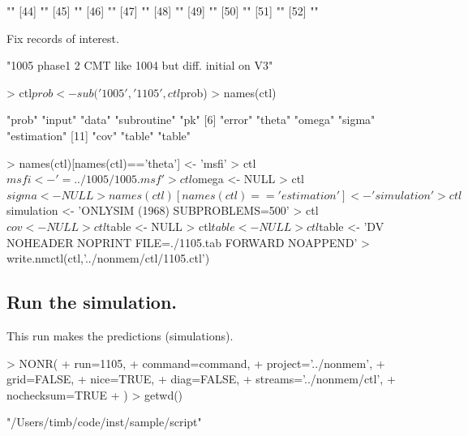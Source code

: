 \begin{Schunk}
\begin{Soutput}
[43] ""                                                                                            
[44] ""                                                                                            
[45] ""                                                                                            
[46] ""                                                                                            
[47] ""                                                                                            
[48] ""                                                                                            
[49] ""                                                                                            
[50] ""                                                                                            
[51] ""                                                                                            
[52] ""                                                                                            
\end{Soutput}
\end{Schunk}
Fix records of interest.
\begin{Schunk}
\begin{Soutput}
[1] "1005 phase1 2 CMT like 1004 but diff. initial on V3"
\end{Soutput}
\begin{Sinput}
> ctl$prob <- sub('1005','1105',ctl$prob)
> names(ctl)
\end{Sinput}
\begin{Soutput}
 [1] "prob"       "input"      "data"       "subroutine" "pk"        
 [6] "error"      "theta"      "omega"      "sigma"      "estimation"
[11] "cov"        "table"      "table"     
\end{Soutput}
\begin{Sinput}
> names(ctl)[names(ctl)=='theta'] <- 'msfi'
> ctl$msfi <- '=../1005/1005.msf'
> ctl$omega <- NULL
> ctl$sigma <- NULL
> names(ctl)[names(ctl)=='estimation'] <- 'simulation'
> ctl$simulation <- 'ONLYSIM (1968) SUBPROBLEMS=500'
> ctl$cov <- NULL
> ctl$table <- NULL
> ctl$table <- NULL
> ctl$table <- 'DV NOHEADER NOPRINT FILE=./1105.tab FORWARD NOAPPEND'
> write.nmctl(ctl,'../nonmem/ctl/1105.ctl')
\end{Sinput}
\end{Schunk}
\subsection{Run the simulation.}
This run makes the predictions (simulations).
\begin{Schunk}
\begin{Sinput}
> NONR(
+      run=1105,
+      command=command,
+      project='../nonmem',
+      grid=FALSE,
+      nice=TRUE,
+      diag=FALSE,
+      streams='../nonmem/ctl',
+      nochecksum=TRUE
+ )
> getwd()
\end{Sinput}
\begin{Soutput}
[1] "/Users/timb/code/inst/sample/script"
\end{Soutput}
\end{Schunk}

